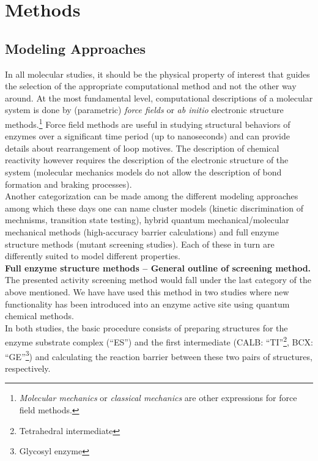 \section{Methods}\label{sec:methods}
\subsection{Modeling Approaches}\label{sec:modeling}
In all molecular studies, it should be the physical property of interest that guides the selection of the appropriate computational method and not the other way around.
At the most fundamental level, computational descriptions of a molecular system is done by (parametric) \textit{force fields} or \textit{ab initio} electronic structure methods.\footnote{\textit{Molecular mechanics} or \textit{classical mechanics} are other expressions for force field methods.}
Force field methods are useful in studying structural behaviors of enzymes over a significant time period (up to nanoseconds) and can provide details about rearrangement of loop motives.
The description of chemical reactivity however requires the description of the electronic structure of the system (molecular mechanics models do not allow the description of bond formation and braking processes).\\
Another categorization can be made among the different modeling approaches among which these days one can name cluster models (kinetic discrimination of mechnisms, transition state testing), hybrid quantum mechanical/molecular mechanical methods (high-accuracy barrier calculations) and full enzyme structure methods (mutant screening studies).
Each of these in turn are differently suited to model different properties.\\
\textbf{Full enzyme structure methods -- General outline of screening method.}
The presented activity screening method would fall under the last category of the above mentioned.
We have have used this method in two studies where new functionality has been introduced into an enzyme active site using quantum chemical methods\cite{10.1371/journal.pone.0049849,hediger2013silico,hediger2013computational}.\\
In both studies, the basic procedure consists of preparing structures for the enzyme substrate complex (``ES'') and the first intermediate (CALB: ``TI''\footnote{Tetrahedral intermediate}, BCX: ``GE''\footnote{\label{foot:ge}Glycosyl enzyme}) and calculating the reaction barrier between these two pairs of structures, respectively.
